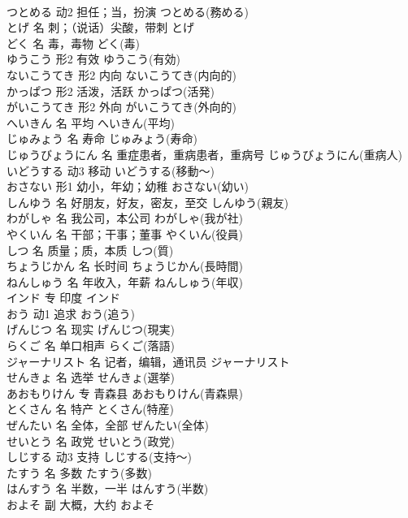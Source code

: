 \documentclass[8pt]{extreport}
\begin{document}
\begin{CJK}{UTF8}{min}
\\	つとめる	动2	担任；当，扮演	つとめる(務める)	
\\	とげ	名	刺；（说话）尖酸，带刺	とげ	
\\	どく	名	毒，毒物	どく(毒)	
\\	ゆうこう	形2	有效	ゆうこう(有効)	
\\	ないこうてき	形2	内向	ないこうてき(内向的)	
\\	かっぱつ	形2	活泼，活跃	かっぱつ(活発)	
\\	がいこうてき	形2	外向	がいこうてき(外向的)	
\\	へいきん	名	平均	へいきん(平均)	
\\	じゅみょう	名	寿命	じゅみょう(寿命)	
\\	じゅうびょうにん	名	重症患者，重病患者，重病号	じゅうびょうにん(重病人)	
\\	いどうする	动3	移动	いどうする(移動～)	
\\	おさない	形1	幼小，年幼；幼稚	おさない(幼い)	
\\	しんゆう	名	好朋友，好友，密友，至交	しんゆう(親友)	
\\	わがしゃ	名	我公司，本公司	わがしゃ(我が社)	
\\	やくいん	名	干部；干事；董事	やくいん(役員)	
\\	しつ	名	质量；质，本质	しつ(質)	
\\	ちょうじかん	名	长时间	ちょうじかん(長時間)	
\\	ねんしゅう	名	年收入，年薪	ねんしゅう(年収)	
\\	インド	专	印度	インド	
\\	おう	动1	追求	おう(追う)	
\\	げんじつ	名	现实	げんじつ(現実)	
\\	らくご	名	单口相声	らくご(落語)	
\\	ジャーナリスト	名	记者，编辑，通讯员	ジャーナリスト	
\\	せんきょ	名	选举	せんきょ(選挙)	
\\	あおもりけん	专	青森县	あおもりけん(青森県)	
\\	とくさん	名	特产	とくさん(特産)	
\\	ぜんたい	名	全体，全部	ぜんたい(全体)	
\\	せいとう	名	政党	せいとう(政党)	
\\	しじする	动3	支持	しじする(支持～)	
\\	たすう	名	多数	たすう(多数)	
\\	はんすう	名	半数，一半	はんすう(半数)	
\\	およそ	副	大概，大约	およそ	

\end{CJK}
\end{document}
